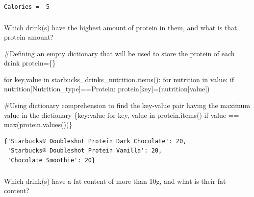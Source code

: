 \documentclass[
  letterpaper,
  DIV=11,
  numbers=noendperiod]{scrreprt}
\newenvironment{Shaded}{\begin{snugshade}}{\end{snugshade}}
\newcommand{\BuiltInTok}[1]{\textcolor[rgb]{0.00,0.23,0.31}{#1}}
\newcommand{\CommentTok}[1]{\textcolor[rgb]{0.37,0.37,0.37}{#1}}
\newcommand{\ControlFlowTok}[1]{\textcolor[rgb]{0.00,0.23,0.31}{#1}}
\newcommand{\KeywordTok}[1]{\textcolor[rgb]{0.00,0.23,0.31}{#1}}
\newcommand{\NormalTok}[1]{\textcolor[rgb]{0.00,0.23,0.31}{#1}}
\newcommand{\OperatorTok}[1]{\textcolor[rgb]{0.37,0.37,0.37}{#1}}
\newcommand{\StringTok}[1]{\textcolor[rgb]{0.13,0.47,0.30}{#1}}
\begin{document}
\begin{verbatim}
Calories =  5
\end{verbatim}

\hypertarget{section-14}{%
\subsubsection{}\label{section-14}}

Which drink(s) have the highest amount of protein in them, and what is
that protein amount?

\begin{Shaded}
\begin{Highlighting}[]
\CommentTok{\#Defining an empty dictionary that will be used to store the protein of each drink}
\NormalTok{protein}\OperatorTok{=}\NormalTok{\{\}}

\ControlFlowTok{for}\NormalTok{ key,value }\KeywordTok{in}\NormalTok{ starbucks\_drinks\_nutrition.items():}
    \ControlFlowTok{for}\NormalTok{ nutrition }\KeywordTok{in}\NormalTok{ value:        }
        \ControlFlowTok{if}\NormalTok{ nutrition[}\StringTok{\textquotesingle{}Nutrition\_type\textquotesingle{}}\NormalTok{]}\OperatorTok{==}\StringTok{\textquotesingle{}Protein\textquotesingle{}}\NormalTok{:}
\NormalTok{            protein[key]}\OperatorTok{=}\NormalTok{(nutrition[}\StringTok{\textquotesingle{}value\textquotesingle{}}\NormalTok{])}

\CommentTok{\#Using dictionary comprehension to find the key{-}value pair having the maximum value in the dictionary}
\NormalTok{\{key:value }\ControlFlowTok{for}\NormalTok{ key, value }\KeywordTok{in}\NormalTok{ protein.items() }\ControlFlowTok{if}\NormalTok{ value }\OperatorTok{==} \BuiltInTok{max}\NormalTok{(protein.values())\}}
\end{Highlighting}
\end{Shaded}

\begin{verbatim}
{'Starbucks® Doubleshot Protein Dark Chocolate': 20,
 'Starbucks® Doubleshot Protein Vanilla': 20,
 'Chocolate Smoothie': 20}
\end{verbatim}

\hypertarget{section-15}{%
\subsubsection{}\label{section-15}}

Which drink(s) have a fat content of more than 10g, and what is their
fat content?
\end{document}
